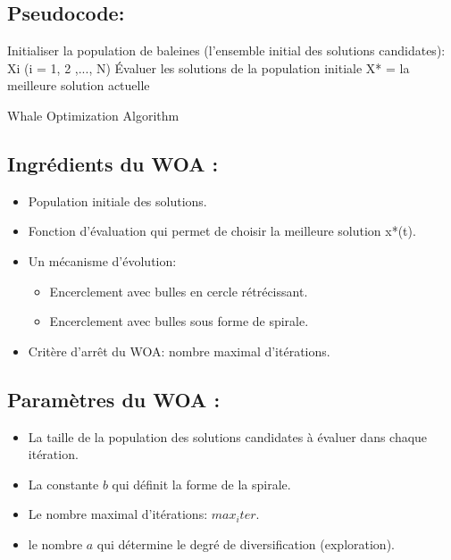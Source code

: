 \documentclass[class=article, crop=false]{standalone}
\begin{document}
\subsection{Pseudocode:}
\begin{algorithm}[H]
    \SetAlgoLined
    Initialiser la population de baleines (l'ensemble initial des solutions candidates): Xi (i = 1, 2 ,..., N)\;
    Évaluer les solutions de la population initiale\;
    X* = la meilleure solution actuelle\;
    \caption{Whale Optimization Algorithm}
    \end{algorithm}
\subsection{Ingrédients du WOA :}
\begin{itemize}
    \item Population initiale des solutions.
    \item Fonction d’évaluation qui permet de choisir la meilleure solution x*(t).
    \item Un mécanisme d'évolution:
    \begin{itemize}
        \item Encerclement avec bulles en cercle rétrécissant.
        \item Encerclement avec bulles sous forme de spirale.
    \end{itemize}
    \item Critère d'arrêt du WOA: nombre maximal d’itérations.    
\end{itemize}
\subsection{Paramètres du WOA :}
\begin{itemize}
    \item La taille de la population des solutions candidates à évaluer dans chaque itération.
    \item La constante \(b\) qui définit la forme de la spirale.
    \item Le nombre maximal d’itérations: \(max_iter\).
    \item le nombre \(a\) qui détermine le degré de diversification (exploration).    
\end{itemize}
\end{document}
